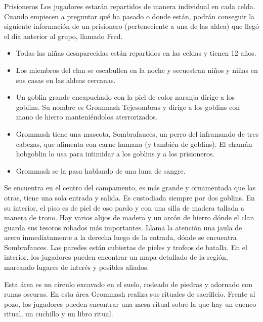 \documentclass[10pt,twoside,twocolumn,openany]{dndbook}
\begin{document}
\begin{DndComment}{Prisioneros}
Los jugadores estarán repartidos de manera individual en cada celda. Cuando empiecen a preguntar qué 
ha pasado o donde están, podrán conseguir la siguiente información de un prisionero (perteneciente 
a una de las aldea) que llegó el día anterior al grupo, llamado Fred.

\begin{itemize}
    \item Todas las niñas desaparecidas están repartidos en las celdas y tienen 12 años.
    \item Los miembros del clan se escabullen en la noche y secuestran niños y niñas en sus casas en las aldeas cercanas.
    \item Un goblin grande encapuchado con la piel de color naranja dirige a los goblins. Su nombre es Grommash Tejesombras y dirige a los goblins con mano de hierro manteniéndolos aterrorizados.
    \item Grommash tiene una mascota, Sombrafauces, un perro del inframundo de tres cabezas, que alimenta con carne humana (y también de goblins). El chamán hobgoblin lo usa para intimidar a los goblins y a los prisioneros.
    \item Grommash se la pasa hablando de una luna de sangre.
\end{itemize}

\end{DndComment}

Se encuentra en el centro del campamento, es más grande y ornamentada que las otras, tiene una sola 
entrada y salida. Es custodiada siempre por dos goblins. En su interior, el piso es de piel de oso pardo 
y con una silla de madera tallada a manera de trono. Hay varios alijos de madera y un arcón de hierro 
dónde el clan guarda sus tesoros robados más importantes. Llama la atención una jaula de acero 
inmediatamente a la derecha luego de la entrada, dónde se encuentra Sombrafauces. Las paredes están 
cubiertas de pieles y trofeos de batalla. En el interior, los jugadores pueden encontrar un mapa 
detallado de la región, marcando lugares de interés y posibles aliados.

Esta área es un círculo excavado en el suelo, rodeado de piedras y adornado con runas oscuras. En esta 
área Grommash realiza sus rituales de sacrificio. Frente al pozo, los jugadores pueden encontrar 
una mesa ritual sobre la que hay un cuenco ritual, un cuchillo y un libro ritual.
\end{document}
